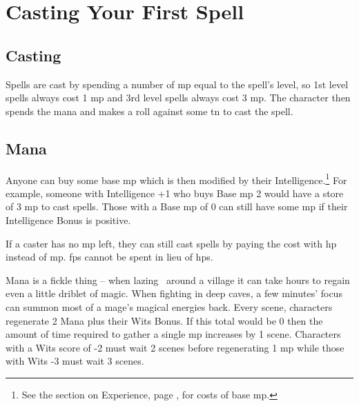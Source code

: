 \section[Spellcasting]{Casting Your First Spell}

\begin{multicols}{2}

\subsection{Casting}

Spells are cast by spending a number of \gls{mp} equal to the spell's level, so 1st level spells always cost 1 \gls{mp} and 3rd level spells always cost 3 \gls{mp}.
The character then spends the mana and makes a roll against some \gls{tn} to cast the spell.

\subsection{Mana}

Anyone can buy some base \gls{mp} which is then modified by their Intelligence.\footnote{See the section on Experience, page \pageref{xp}, for costs of base \gls{mp}.} For example, someone with Intelligence +1 who buys Base \gls{mp} 2 would have a store of 3 \gls{mp} to cast spells. Those with a Base \gls{mp} of 0 can still have some \gls{mp} if their Intelligence Bonus is positive.

If a caster has no \gls{mp} left, they can still cast spells by paying the cost with \gls{hp} instead of \gls{mp}.
\iftoggle{verbose}{%
The magical energies pull the power they need from the blood and bones of the caster, leaving them with a bleeding nose, raging headache and sometimes stranger effects such as acidic pustules or discoloured skin patches.
Many a desperate caster has died through the use of their own magic rather than an enemy's sword; a wizard with their back to the wall is a dangerous opponent indeed.
}{}
\Glspl{fp} cannot be spent in lieu of \glspl{hp}.

Mana is a fickle thing -- when lazing \ around a village it can take hours to regain even a little driblet of magic.
When fighting in deep caves, a few minutes' focus can summon most of a mage's magical energies back.
Every scene, characters regenerate 2 Mana plus their Wits Bonus.
If this total would be 0 then the amount of time required to gather a single \gls{mp} increases by 1 scene.
Characters with a Wits score of -2 must wait 2 scenes before regenerating 1 \gls{mp} while those with Wits -3 must wait 3 scenes.


\end{multicols}
